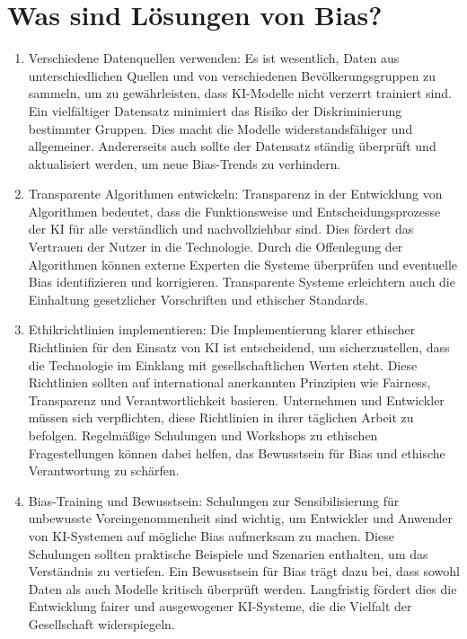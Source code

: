 \section{Was sind Lösungen von Bias?}
\begin{enumerate}
    \item Verschiedene Datenquellen verwenden: Es ist wesentlich, Daten aus
    unterschiedlichen Quellen und von verschiedenen Bevölkerungsgruppen zu 
    sammeln, um zu gewährleisten, dass KI-Modelle nicht verzerrt trainiert sind.
    Ein vielfältiger Datensatz minimiert das Risiko der Diskriminierung bestimmter Gruppen.
    Dies macht die Modelle widerstandsfähiger und allgemeiner. Andererseits auch sollte
    der Datensatz ständig überprüft und aktualisiert werden, um neue Bias-Trends 
    zu verhindern.

    \item Transparente Algorithmen entwickeln: Transparenz in der Entwicklung von Algorithmen 
    bedeutet, dass die Funktionsweise und Entscheidungsprozesse der KI für alle verständlich 
    und nachvollziehbar sind. Dies fördert das Vertrauen der Nutzer in die Technologie. 
    Durch die Offenlegung der Algorithmen können externe Experten die Systeme überprüfen 
    und eventuelle Bias identifizieren und korrigieren. Transparente Systeme erleichtern 
    auch die Einhaltung gesetzlicher Vorschriften und ethischer Standards.

    \item Ethikrichtlinien implementieren: Die Implementierung klarer ethischer Richtlinien für 
    den Einsatz von KI ist entscheidend, um sicherzustellen, dass die Technologie im Einklang 
    mit gesellschaftlichen Werten steht. Diese Richtlinien sollten auf international anerkannten 
    Prinzipien wie Fairness, Transparenz und Verantwortlichkeit basieren. Unternehmen und Entwickler 
    müssen sich verpflichten, diese Richtlinien in ihrer täglichen Arbeit zu befolgen. Regelmäßige 
    Schulungen und Workshops zu ethischen Fragestellungen können dabei helfen, das Bewusstsein für Bias und
    ethische Verantwortung zu schärfen.

    \item Bias-Training und Bewusstsein: Schulungen zur Sensibilisierung für unbewusste Voreingenommenheit
     sind wichtig, um Entwickler und Anwender von KI-Systemen auf mögliche Bias aufmerksam zu machen.
     Diese Schulungen sollten praktische Beispiele und Szenarien enthalten, um das Verständnis zu vertiefen. 
     Ein Bewusstsein für Bias trägt dazu bei, dass sowohl Daten als auch Modelle kritisch überprüft werden.
     Langfristig fördert dies die Entwicklung fairer und ausgewogener KI-Systeme, die die Vielfalt der Gesellschaft 
     widerspiegeln.
\end{enumerate}